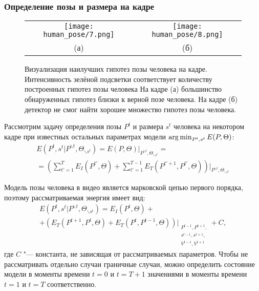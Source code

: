 \subsubsection{Определение позы и размера на кадре}

\begin{figure}[t]
	\begin{center}
		\begin{tabular}{cc}
			\texttt{[image: human\_pose/7.png]} & \texttt{[image: human\_pose/8.png]} \\
			(а) & (б)
		\end{tabular}
		\caption{Визуализация наилучших гипотез позы человека на кадре. Интенсивность зелёной подсветки соответствует количеству построенных гипотез позы человека На кадре (а) большинство обнаруженных гипотез близки к верной позе человека. На кадре (б) детектор не смог найти хорошее множество гипотез позы человека.}
		\label{fig:good_bad_hypotheses}
	\end{center}
\end{figure}

Рассмотрим задачу определения позы $P^t$ и размера $s^t$ человека на некотором кадре при известных остальных параметрах модели $\operatorname*{arg\,min}_{P^t, s^t} E(P, \Theta)$:
\begin{multline}
	E(P^t, s^t| P^{\backslash t}, \Theta_{\backslash s^t}) = E(P, \Theta)\bigg\rvert_{P^{\backslash t}, \Theta_{\backslash s^t}} = \\ = \left(\sum_{t'=1}^T{E_I(P^{t'}, \Theta)} + \sum_{t'=1}^{T-1}{E_T(P^{t'+1}, P^{t'}, \Theta)}\right)\bigg\rvert_{P^{\backslash t}, \Theta_{\backslash s^t}}
\end{multline}

Модель позы человека в видео является марковской цепью первого порядка, поэтому рассматриваемая энергия имеет вид:
\begin{multline}
	E(P^t, s^t| P^{\backslash t}, \Theta_{\backslash s^t}) = E_I(P^{t}, \Theta) + \\ + \left(E_T(P^{t+1}, P^{t}, \Theta) + E_T(P^{t}, P^{t-1}, \Theta)\right)\bigg\rvert_{\substack{P^{t-1}, P^{t+1}, \\ s^{t-1}, s^{t+1}, \\ V^{t-1}, V^{t+1}}} + C,
\end{multline}
где $C$ "--- константа, не зависящая от рассматриваемых параметров. Чтобы не рассматривать отдельно случаи граничные случаи, можно определить состояние модели в моменты времени $t=0$ и $t=T+1$ значениями в моменты времени $t=1$ и $t=T$ соответственно.

